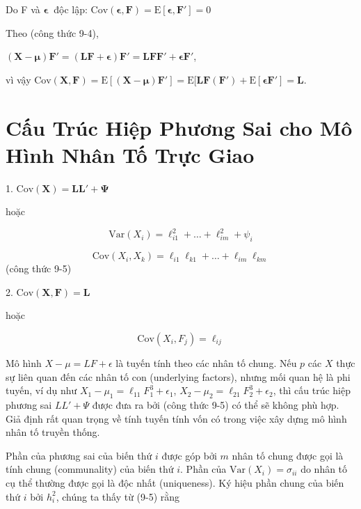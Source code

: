 \documentclass{article}
\begin{document}
Do F và $\boldsymbol{\epsilon}\ $ độc lập: \(\text{Cov}(\boldsymbol{\epsilon}, \mathbf{F}) = \text{E}[\boldsymbol{\epsilon}, \mathbf{F}'] = 0\)

Theo (công thức 9-4), 

\((\mathbf{X} - \boldsymbol{\mu})\mathbf{F}' = (\mathbf{LF} + \boldsymbol{\epsilon})\mathbf{F}' = \mathbf{LF}\mathbf{F}' + \boldsymbol{\epsilon}\mathbf{F}'\),

vì vậy \(\text{Cov}(\mathbf{X}, \mathbf{F}) = \text{E}[(\mathbf{X} - \boldsymbol{\mu})\mathbf{F}'] = \text{E}[\mathbf{LF}(\mathbf{F}') + \text{E}[\boldsymbol{\epsilon}\mathbf{F}'] = \mathbf{L}\).


\section*{Cấu Trúc Hiệp Phương Sai cho Mô Hình Nhân Tố Trực Giao}

1. \(\text{Cov}(\mathbf{X}) = \mathbf{LL}' + \boldsymbol{\Psi}\)

hoặc

\[
\text{Var}(X_i) = \ell_{i1}^2 + \ldots + \ell_{im}^2 + \psi_i
\]

\[
\text{Cov}(X_i, X_k) = \ell_{i1}\ell_{k1} + \ldots + \ell_{im}\ell_{km}
\]
(công thức 9-5)
\vspace{0.6cm}




2. \(\text{Cov}(\mathbf{X}, \mathbf{F}) = \mathbf{L}\)

hoặc

\[
\text{Cov}(X_i, F_j) = \ell_{ij}
\]


\vspace{0.6cm}


Mô hình \(X - \mu = LF + \epsilon\) là tuyến tính theo các nhân tố chung. Nếu  \(p\) các \(X\) thực sự liên quan đến các nhân tố con (underlying factors), nhưng mối quan hệ là phi tuyến, ví dụ như \(X_1 - \mu_1 = \ell_{11}F_1^3 + \epsilon_1\), \(X_2 - \mu_2 = \ell_{21}F_2^3 + \epsilon_2\), thì cấu trúc hiệp phương sai \(LL' + \Psi\) được đưa ra bởi (công thức 9-5) có thể sẽ không phù hợp. Giả định rất quan trọng về tính tuyến tính vốn có trong việc xây dựng mô hình nhân tố truyền thống.

Phần của phương sai của biến thứ \(i\) được góp bởi \(m\) nhân tố chung  được gọi là tính chung (communality) của biến thứ \(i\). Phần của \(\text{Var}(X_i) = \sigma_{ii}\) do nhân tố cụ thể thường được gọi là độc nhất (uniqueness). Ký hiệu phần chung của biến thứ \(i\) bởi \(h_i^2\), chúng ta thấy từ (9-5) rằng
\end{document}
